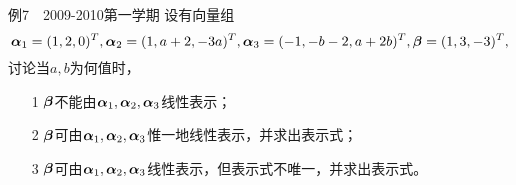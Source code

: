 \begin{frame}\ft{\subsecname}
  \begin{footnotesize}
    \begin{exampleblock}{例7~~2009-2010第一学期}
    设有向量组$$\boldsymbol{\alpha}_1=(1,2,0)^T,\boldsymbol{\alpha}_2=(1,a+2,-3a)^T,\boldsymbol{\alpha}_3=(-1,-b-2,a+2b)^T,\boldsymbol{\beta}=(1,3,-3)^T,$$
    讨论当$a,b$为何值时，
    \begin{itemize}
      \item[1] $\boldsymbol{\beta}$不能由$\boldsymbol{\alpha}_1,\boldsymbol{\alpha}_2,\boldsymbol{\alpha}_3$线性表示；
      \item[2] $\boldsymbol{\beta}$可由$\boldsymbol{\alpha}_1,\boldsymbol{\alpha}_2,\boldsymbol{\alpha}_3$惟一地线性表示，并求出表示式；
      \item[3] $\boldsymbol{\beta}$可由$\boldsymbol{\alpha}_1,\boldsymbol{\alpha}_2,\boldsymbol{\alpha}_3$线性表示，但表示式不唯一，并求出表示式。
      \end{itemize}
    \end{exampleblock}
  \end{footnotesize}
\end{frame}



